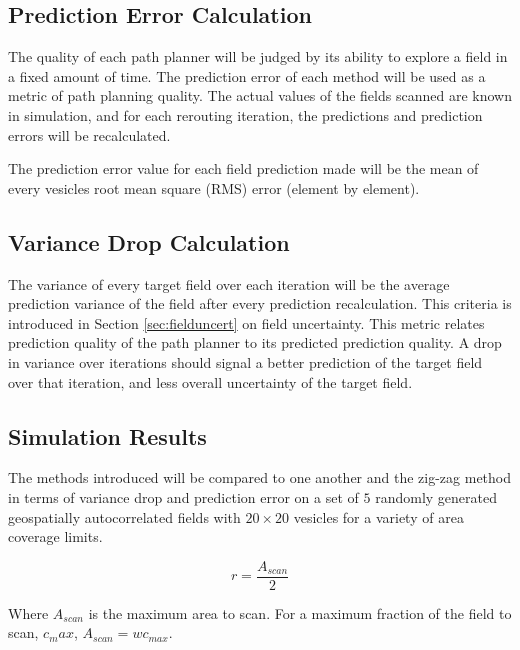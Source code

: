 \subsection{Prediction Error Calculation}
The quality of each path planner will be judged by its ability to explore a field in a fixed amount of time. The prediction error of each method will be used as a metric of path planning quality. The actual values of the fields scanned are known in simulation, and for each rerouting iteration, the predictions and prediction errors will be recalculated.

The prediction error value for each field prediction made will be the mean of every vesicles root mean square (RMS) error (element by element).

\subsection{Variance Drop Calculation}
The variance of every target field over each iteration will be the average prediction variance of the field after every prediction recalculation. This criteria is introduced in Section \ref{sec:fielduncert} on field uncertainty. This metric relates prediction quality of the path planner to its predicted prediction quality. A drop in variance over iterations should signal a better prediction of the target field over that iteration, and less overall uncertainty of the target field.

\subsection{Simulation Results}
The methods introduced will be compared to one another and the zig-zag method in terms of variance drop and prediction error on a set of $5$ randomly generated geospatially autocorrelated fields with $20\times20$ vesicles for a variety of area coverage limits.



\begin{equation}
	r = \frac{A_{scan}}{2}
\end{equation}

Where $A_{scan}$ is the maximum area to scan. For a maximum fraction of the field to scan, $c_max$, $A_{scan} = wc_{max}$.

